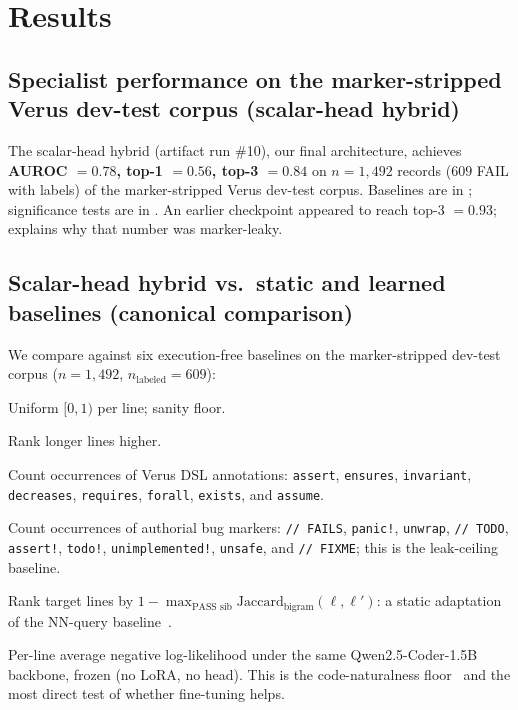 \documentclass[10pt]{article}
\begin{document}
\section{Results}
\label{sec:results}

\subsection{Specialist performance on the marker-stripped Verus dev-test corpus (scalar-head hybrid)}
\label{sec:results:headline}

The scalar-head hybrid (artifact run \#10), our final architecture, achieves
\textbf{AUROC $= 0.78$, top-1 $= 0.56$, top-3 $= 0.84$} on $n=1{,}492$
records ($609$ FAIL with labels) of the marker-stripped Verus
dev-test corpus. Baselines are in ;
significance tests are in . An earlier
checkpoint appeared to reach top-3 $=0.93$; 
explains why that number was marker-leaky.

\subsection{Scalar-head hybrid vs.\ static and learned baselines (canonical comparison)}
\label{sec:results:run10-baselines}

We compare against six execution-free baselines on the marker-stripped
dev-test corpus ($n=1{,}492$, $n_{\text{labeled}}=609$):

\begin{description}[leftmargin=1.5em,itemsep=0pt]
\item[\normalfont\textsc{Random}] Uniform $[0,1)$ per line; sanity floor.
\item[\normalfont\textsc{Length}] Rank longer lines higher.
\item[\normalfont\textsc{Verus keyword}] Count occurrences of Verus DSL
  annotations: \texttt{assert}, \texttt{ensures}, \texttt{invariant},
  \texttt{decreases}, \texttt{requires}, \texttt{forall}, \texttt{exists}, and
  \texttt{assume}.
\item[\normalfont\textsc{Marker keyword}] Count occurrences of authorial bug
  markers: \texttt{// FAILS}, \texttt{panic!}, \texttt{unwrap},
  \texttt{// TODO}, \texttt{assert!}, \texttt{todo!},
  \texttt{unimplemented!}, \texttt{unsafe}, and \texttt{// FIXME}; this is the
  leak-ceiling baseline.
\item[\normalfont\textsc{Diff-from-sibling}] Rank target lines by
  $1 - \max_{\text{PASS sib}} \mathrm{Jaccard}_{\text{bigram}}(\ell, \ell')$:
  a static adaptation of the NN-query baseline~\cite{renieris2003nnqueries}.
\item[\normalfont\textsc{Qwen surprisal}] Per-line average negative log-likelihood
  under the same Qwen2.5-Coder-1.5B backbone, frozen (no LoRA, no head).
  This is the code-naturalness floor~\cite{hindle2012naturalness,karampatsis2020openvocab}
  and the most direct test of whether fine-tuning helps.
\end{description}
\end{document}
